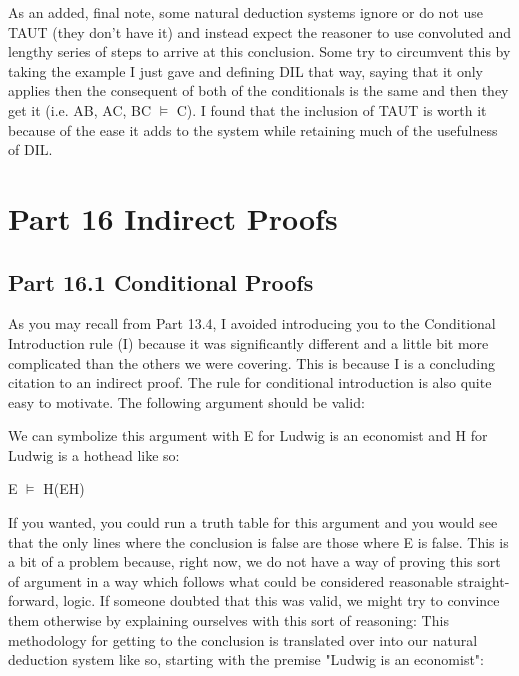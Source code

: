As an added, final note, some natural deduction systems ignore or do not use TAUT (they don't have it) and instead expect the reasoner to use convoluted and lengthy series of steps to arrive at this conclusion. Some try to circumvent this by taking the example I just gave and defining DIL that way, saying that it only applies then the consequent of both of the conditionals is the same and then they get it (i.e. A\eor B, A\eif C, B\eif C $\vDash$ C). I found that the inclusion of TAUT is worth it because of the ease it adds to the system while retaining much of the usefulness of DIL.
\chapter{Part 16 Indirect Proofs}
\section{Part 16.1 Conditional Proofs}
As you may recall from Part 13.4, I avoided introducing you to the Conditional Introduction rule (\eif I) because it was significantly different and a little bit more complicated than the others we were covering. This is because \eif I is a concluding citation to an indirect proof. The rule for conditional introduction is also quite easy to motivate. The following argument should be valid:

We can symbolize this argument with E for Ludwig is an economist and H for Ludwig is a hothead like so:
\begin{center}
E $\vDash$ H\eif (E\eand H)
\end{center}
If you wanted, you could run a truth table for this argument and you would see that the only lines where the conclusion is false are those where E is false. This is a bit of a problem because, right now, we do not have a way of proving this sort of argument in a way which follows what could be considered reasonable straight-forward, logic. If someone doubted that this was valid, we might try to convince them otherwise by explaining ourselves with this sort of reasoning:
This methodology for getting to the conclusion is translated over into our natural deduction system like so, starting with the premise "Ludwig is an economist":
	\begin{fitchproof}
	\end{fitchproof}				

